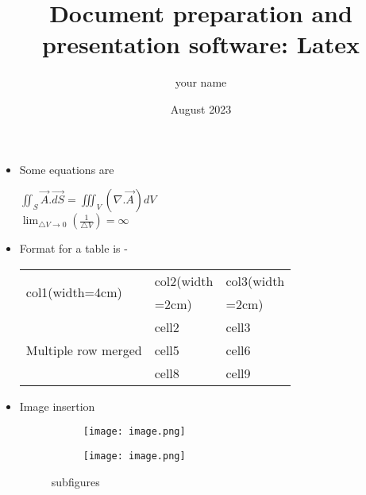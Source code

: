 \documentclass{article}
\title{\textbf{Document preparation and presentation software: Latex}}
\author{your name }
\date{August 2023}
\begin{document}
\maketitle
\begin{itemize}
    \item Some equations are\\
    \begin{center}
        $\iint_{S} \Vec{A}.\Vec{dS}=\iiint_{V}{(\nabla.\Vec{A})dV}$ \\
       $ \lim_{\triangle V\to 0} (\frac{1}{\triangle V} )=\infty $       
    \end{center}

    \item Format for a table is -
\begin{center}

\begin{tabular}{ |p{4cm}|p{2cm}|p{2cm}| } 
\hline
\multirow{2}{4em}{col1(width=4cm)} & col2(width & col3(width\\
 & =2cm) & =2cm)\\
\hline
\multirow{3}{4em}{Multiple row merged } & cell2 & cell3 \\\cline{2-3}

 & cell5 & cell6 \\\cline{2-3}  

& cell8 & cell9 \\\cline{2-3} 
\hline
\end{tabular}
\end{center}

    \item Image insertion\\
\begin{figure}[htbp]
     \begin{subfigure}
         \centering
         \texttt{[image: image.png]}
         \label{keshav logo}
     \end{subfigure}
     \hfill
     \begin{subfigure}
         \centering
         \texttt{[image: image.png]}
         \label{keshav logo}
     \end{subfigure}     
        \caption{subfigures}
        \label{fig:subfigs}
\end{figure}
\end{itemize}
\end{document}
